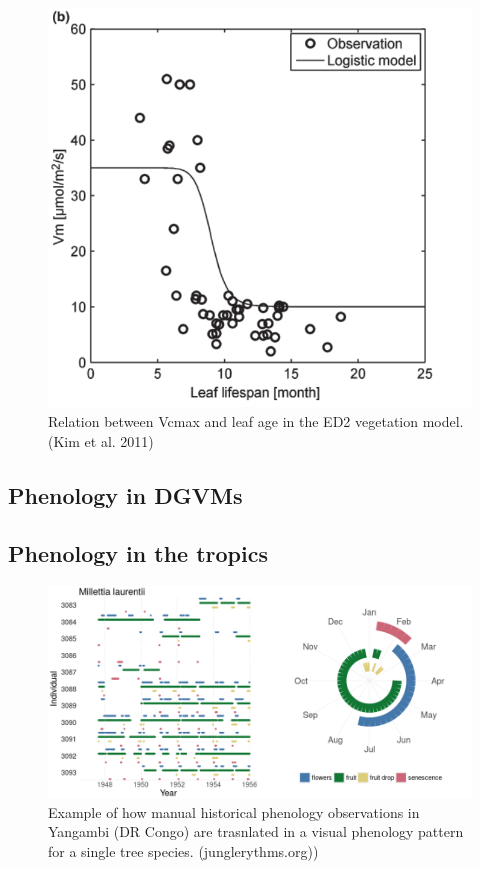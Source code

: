 \documentclass[12pt,oneside]{book}
\begin{document}
\begin{figure}

{\centering \includegraphics[width=0.8\linewidth]{figures/chap4/f46_vc_age} 

}

\caption{Relation  between Vcmax and leaf age in the ED2 vegetation model. (Kim et al. 2011)}\label{fig:f46}
\end{figure}

\subsection{Phenology in DGVMs}\label{phenology-in-dgvms}

\subsection{Phenology in the tropics}\label{phenology-in-the-tropics}

\begin{figure}

{\centering \includegraphics[width=0.8\linewidth]{figures/chap4/f49_junglerythms} 

}

\caption{Example of how manual historical phenology observations in Yangambi (DR Congo) are trasnlated in a visual phenology pattern for a single tree species. (junglerythms.org))}\label{fig:f49}
\end{figure}
\end{document}
